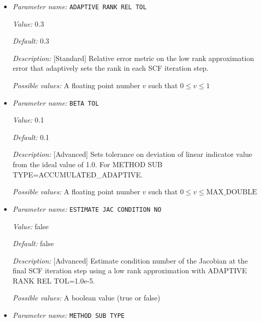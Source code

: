 \begin{itemize}
\item {\it Parameter name:} {\tt ADAPTIVE RANK REL TOL}
\label{parameters:SCF parameters/LOW RANK DIELECM PRECOND/ADAPTIVE RANK REL TOL}
\label{parameters:SCF_20parameters/LOW_20RANK_20DIELECM_20PRECOND/ADAPTIVE_20RANK_20REL_20TOL}


{\it Value:} 0.3


{\it Default:} 0.3


{\it Description:} [Standard] Relative error metric on the low rank approximation error that adaptively sets the rank in each SCF iteration step.


{\it Possible values:} A floating point number $v$ such that $0 \leq v \leq 1$
\item {\it Parameter name:} {\tt BETA TOL}
\label{parameters:SCF parameters/LOW RANK DIELECM PRECOND/BETA TOL}
\label{parameters:SCF_20parameters/LOW_20RANK_20DIELECM_20PRECOND/BETA_20TOL}


{\it Value:} 0.1


{\it Default:} 0.1


{\it Description:} [Advanced] Sets tolerance on deviation of linear indicator value from the ideal value of 1.0. For METHOD SUB TYPE=ACCUMULATED\_ADAPTIVE.


{\it Possible values:} A floating point number $v$ such that $0 \leq v \leq \text{MAX\_DOUBLE}$
\item {\it Parameter name:} {\tt ESTIMATE JAC CONDITION NO}
\label{parameters:SCF parameters/LOW RANK DIELECM PRECOND/ESTIMATE JAC CONDITION NO}
\label{parameters:SCF_20parameters/LOW_20RANK_20DIELECM_20PRECOND/ESTIMATE_20JAC_20CONDITION_20NO}


{\it Value:} false


{\it Default:} false


{\it Description:} [Advanced] Estimate condition number of the Jacobian at the final SCF iteration step using a low rank approximation with ADAPTIVE RANK REL TOL=1.0e-5.


{\it Possible values:} A boolean value (true or false)
\item {\it Parameter name:} {\tt METHOD SUB TYPE}
\label{parameters:SCF parameters/LOW RANK DIELECM PRECOND/METHOD SUB TYPE}
\label{parameters:SCF_20parameters/LOW_20RANK_20DIELECM_20PRECOND/METHOD_20SUB_20TYPE}



\end{itemize}
